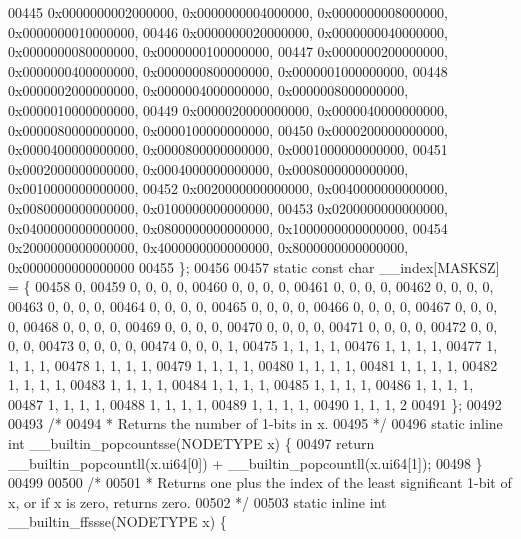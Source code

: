 \begin{DoxyCode}
00445         0x0000000002000000, 0x0000000004000000, 0x0000000008000000, 0x0000000010000000,
00446         0x0000000020000000, 0x0000000040000000, 0x0000000080000000, 0x0000000100000000,
00447         0x0000000200000000, 0x0000000400000000, 0x0000000800000000, 0x0000001000000000,
00448         0x0000002000000000, 0x0000004000000000, 0x0000008000000000, 0x0000010000000000,
00449         0x0000020000000000, 0x0000040000000000, 0x0000080000000000, 0x0000100000000000,
00450         0x0000200000000000, 0x0000400000000000, 0x0000800000000000, 0x0001000000000000,
00451         0x0002000000000000, 0x0004000000000000, 0x0008000000000000, 0x0010000000000000,
00452         0x0020000000000000, 0x0040000000000000, 0x0080000000000000, 0x0100000000000000,
00453         0x0200000000000000, 0x0400000000000000, 0x0800000000000000, 0x1000000000000000,
00454         0x2000000000000000, 0x4000000000000000, 0x8000000000000000, 0x0000000000000000
00455 \};
00456 
00457 \textcolor{keyword}{static} \textcolor{keyword}{const} \textcolor{keywordtype}{char} \_\_index[MASKSZ] = \{
00458         0,
00459         0, 0, 0, 0,
00460         0, 0, 0, 0,
00461         0, 0, 0, 0,
00462         0, 0, 0, 0,
00463         0, 0, 0, 0,
00464         0, 0, 0, 0,
00465         0, 0, 0, 0,
00466         0, 0, 0, 0,
00467         0, 0, 0, 0,
00468         0, 0, 0, 0,
00469         0, 0, 0, 0,
00470         0, 0, 0, 0,
00471         0, 0, 0, 0,
00472         0, 0, 0, 0,
00473         0, 0, 0, 0,
00474         0, 0, 0, 1,
00475         1, 1, 1, 1,
00476         1, 1, 1, 1,
00477         1, 1, 1, 1,
00478         1, 1, 1, 1,
00479         1, 1, 1, 1,
00480         1, 1, 1, 1,
00481         1, 1, 1, 1,
00482         1, 1, 1, 1,
00483         1, 1, 1, 1,
00484         1, 1, 1, 1,
00485         1, 1, 1, 1,
00486         1, 1, 1, 1,
00487         1, 1, 1, 1,
00488         1, 1, 1, 1,
00489         1, 1, 1, 1,
00490         1, 1, 1, 2
00491 \};
00492 
00493 \textcolor{comment}{/*}
00494 \textcolor{comment}{ * Returns the number of 1-bits in x.}
00495 \textcolor{comment}{ */}
00496 \textcolor{keyword}{static} \textcolor{keyword}{inline} \textcolor{keywordtype}{int} \_\_builtin\_popcountsse(NODETYPE x) \{
00497         \textcolor{keywordflow}{return} \_\_builtin\_popcountll(x.ui64[0]) + \_\_builtin\_popcountll(x.ui64[1]);
00498 \}
00499 
00500 \textcolor{comment}{/*}
00501 \textcolor{comment}{ * Returns one plus the index of the least significant 1-bit of x, or if x is zero, returns zero.}
00502 \textcolor{comment}{ */}
00503 \textcolor{keyword}{static} \textcolor{keyword}{inline} \textcolor{keywordtype}{int} \_\_builtin\_ffssse(NODETYPE x) \{

\end{DoxyCode}
